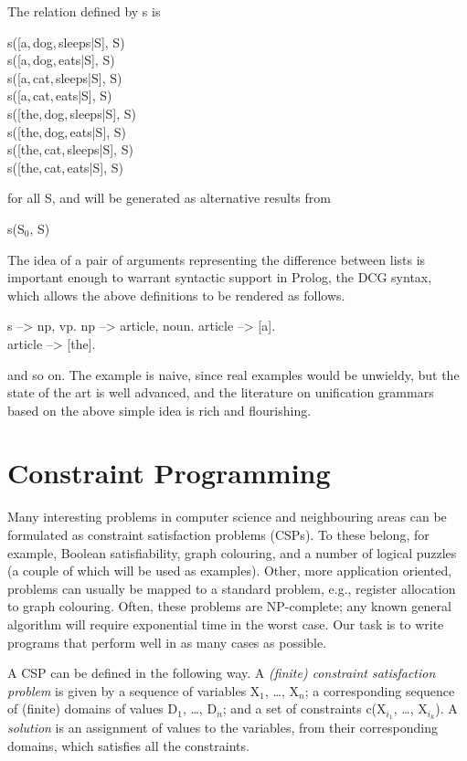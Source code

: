 %
The relation defined by {\prog s} is
%
\begin{progex}
s([a,\,dog,\,sleeps|S], S) \\
s([a,\,dog,\,eats|S], S) \\
s([a,\,cat,\,sleeps|S], S) \\
s([a,\,cat,\,eats|S], S) \\
s([the,\,dog,\,sleeps|S], S) \\
s([the,\,dog,\,eats|S], S) \\
s([the,\,cat,\,sleeps|S], S) \\
s([the,\,cat,\,eats|S], S)
\end{progex}%
%
for all {\prog S}, and will be generated as alternative results from
%
\begin{progex}
s(S$_0$, S)
\end{progex}%
%
The idea of a pair of arguments representing the difference between
lists is important enough to warrant syntactic support in Prolog, the
DCG syntax, which allows the above definitions to be rendered as
follows.
%
\begin{program}
s --> np, vp.  \nl
np --> article, noun.  \nl
article --> [a].  \\
article --> [the].
\end{program}%
%
and so on.  The example is naive, since real examples would be
unwieldy, but the state of the art is well advanced, and the
literature on unification grammars based on the above simple idea is
rich and flourishing.

\section{Constraint Programming}

Many interesting problems in computer science and neighbouring areas
can be formulated as constraint satisfaction problems (CSPs).  To
these belong, for example, Boolean satisfiability, graph colouring,
and a number of logical puzzles (a couple of which will be used as
examples).  Other, more application oriented, problems can usually be
mapped to a standard problem, e.g., register allocation to graph
colouring.  Often, these problems are NP-complete; any known general
algorithm will require exponential time in the worst case.  Our task
is to write programs that perform well in as many cases as possible.

A CSP can be defined in the following way.  A {\em (finite) constraint
satisfaction problem} is given by a sequence of variables {\prog
X$_1$}, \dots, {\prog X$_n$}; a corresponding sequence of (finite)
domains of values {\prog D$_1$}, \dots, {\prog D$_n$}; and a set of
constraints {\prog c(X$_{i_1}$, \dots, X$_{i_k}$)}.  A {\em solution}
is an assignment of values to the variables, from their corresponding
domains, which satisfies all the constraints.

